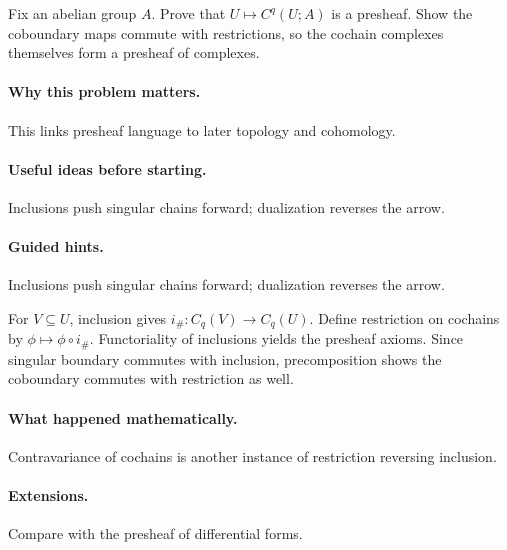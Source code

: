 \begin{problem}
Fix an abelian group $A$.  Prove that $U\mapsto C^q(U;A)$ is a presheaf.  Show the coboundary maps commute with restrictions, so the cochain complexes themselves form a presheaf of complexes.
\end{problem}

\paragraph{Why this problem matters.}
This links presheaf language to later topology and cohomology.

\paragraph{Useful ideas before starting.}
Inclusions push singular chains forward; dualization reverses the arrow.

\paragraph{Guided hints.}
Inclusions push singular chains forward; dualization reverses the arrow.

\begin{solution}
For $V\subseteq U$, inclusion gives $i_\#:C_q(V)\to C_q(U)$.  Define restriction on cochains by $\phi\mapsto\phi\circ i_\#$.  Functoriality of inclusions yields the presheaf axioms.  Since singular boundary commutes with inclusion, precomposition shows the coboundary commutes with restriction as well.
\end{solution}

\paragraph{What happened mathematically.}
Contravariance of cochains is another instance of restriction reversing inclusion.

\paragraph{Extensions.}
Compare with the presheaf of differential forms.

